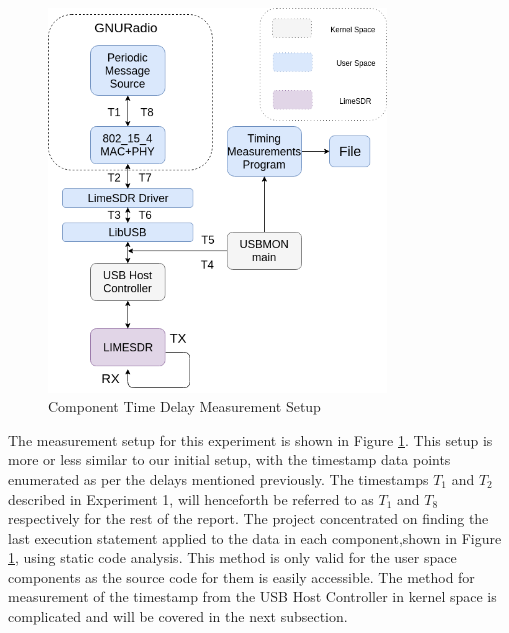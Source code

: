  \begin{figure}[h!]
\centering
\includegraphics[width=0.8\textwidth]{Figure/Setup2.png}
\caption{Component Time Delay Measurement Setup}
\label{component_setup}
\end{figure}

The measurement setup for this experiment is shown in Figure \ref{component_setup}.
This setup is more or less similar to our initial setup, with the timestamp data points enumerated as per the delays mentioned previously.
The timestamps $T_1$ and $T_2$ described in Experiment 1, will henceforth be referred to as $T_1$ and $T_8$ respectively for the rest of the report.
The project concentrated on finding the last execution statement applied to the data in each component,shown in Figure \ref{component_setup}, using static code analysis.
This method is only valid for the user space components as the source code for them is easily accessible.
The method for measurement of the timestamp from the USB Host Controller in kernel space is complicated and will be covered in the next subsection.\\

